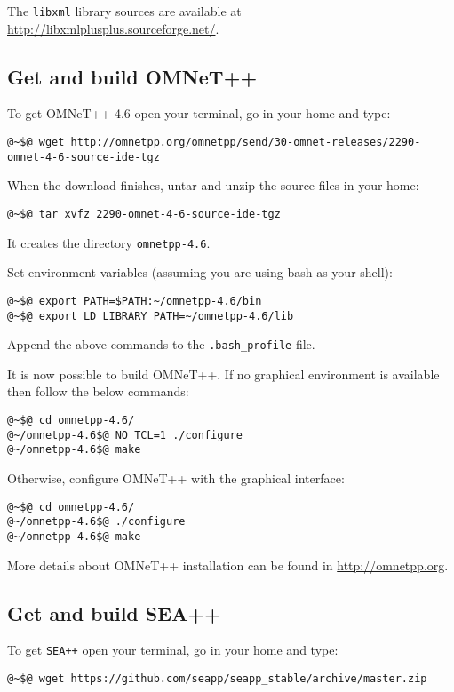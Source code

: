 The \texttt{libxml} library sources are available at \url{http://libxmlplusplus.sourceforge.net/}.



\subsection{Get and build OMNeT++}
To get OMNeT++ 4.6 open your terminal, go in your home and type:
%
\begin{lstlisting}[language={terminal}]
@~$@ wget http://omnetpp.org/omnetpp/send/30-omnet-releases/2290-omnet-4-6-source-ide-tgz
\end{lstlisting}
%
When the download finishes, untar and unzip the source files in your home:
%
\begin{lstlisting}[language={terminal}]
@~$@ tar xvfz 2290-omnet-4-6-source-ide-tgz
\end{lstlisting}
%
It creates the directory \texttt{omnetpp-4.6}.

Set environment variables (assuming you are using bash as your shell):
%
\begin{lstlisting}[language={terminal}]
@~$@ export PATH=$PATH:~/omnetpp-4.6/bin
@~$@ export LD_LIBRARY_PATH=~/omnetpp-4.6/lib
\end{lstlisting}
%
Append the above commands to the \texttt{.bash\_profile} file.

It is now possible to build OMNeT++. If no graphical environment is available then follow the below commands:
%
\begin{lstlisting}[language={terminal}]
@~$@ cd omnetpp-4.6/
@~/omnetpp-4.6$@ NO_TCL=1 ./configure
@~/omnetpp-4.6$@ make
\end{lstlisting}

Otherwise, configure OMNeT++ with the graphical interface:
%
\begin{lstlisting}[language={terminal}]
@~$@ cd omnetpp-4.6/
@~/omnetpp-4.6$@ ./configure
@~/omnetpp-4.6$@ make
\end{lstlisting}

More details about OMNeT++ installation can be found in \url{http://omnetpp.org}.

\subsection{Get and build SEA++}
To get \texttt{SEA++} open your terminal, go in your home and type:
%
\begin{lstlisting}[language={terminal}]
@~$@ wget https://github.com/seapp/seapp_stable/archive/master.zip
\end{lstlisting}
%

